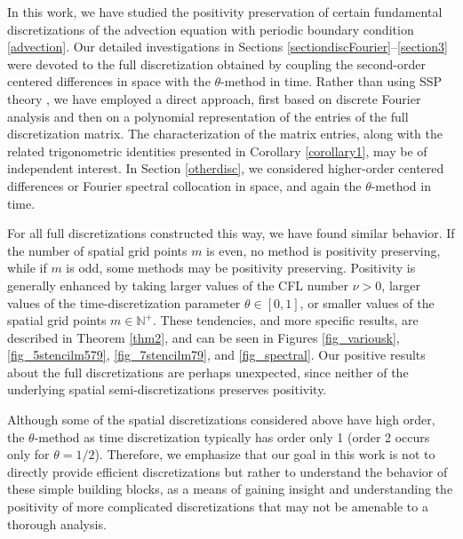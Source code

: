 \documentclass[a4paper]{article}
\begin{document}
In this work, we have studied the positivity preservation of certain fundamental
discretizations of the advection equation with periodic boundary condition \eqref{advection}. 
Our detailed investigations in Sections \ref{sectiondiscFourier}--\ref{section3}
were devoted to the  full discretization obtained by coupling the second-order centered
differences in space with the $\theta$-method in time.  
 Rather than using SSP theory \cite{SSPbook}, 
we have employed a direct
approach, first based on discrete Fourier analysis and then
on a polynomial representation of the entries of the full discretization matrix.
The characterization of the %
matrix entries, %
along with the related trigonometric identities
presented in Corollary \ref{corollary1}, may be of independent interest.
In Section \ref{otherdisc}, we considered higher-order centered
differences or Fourier spectral collocation in space, and again the $\theta$-method in time. 

For all full discretizations constructed this way, we have found similar behavior.
If the number of spatial grid points $m$ is even, no method is positivity
preserving, while if $m$ is odd, some methods may be positivity
preserving.  Positivity is generally enhanced by taking larger values
of the CFL number $\nu>0$, larger values of the time-discretization parameter $\theta\in [0,1]$, or smaller
values of the spatial grid points $m\in\mathbb{N}^+$.  These tendencies, and more specific results, are described
in Theorem \ref{thm2}, and can be seen
in Figures \ref{fig_variousk}, \ref{fig_5stencilm579}, \ref{fig_7stencilm79},
and \ref{fig_spectral}.
Our positive results about the full discretizations are perhaps unexpected, since neither of the underlying spatial semi-discretizations preserves positivity.

Although some of the spatial discretizations considered above have high order, the $\theta$-method as time discretization typically has order only 1 (order 2 occurs only for $\theta=1/2$). Therefore, we emphasize that our goal in this work is not to directly provide efficient discretizations but rather
to understand the behavior of these simple building blocks, as a means
of gaining insight and understanding the positivity of more complicated
discretizations that may not be amenable to a thorough analysis.
\end{document}
